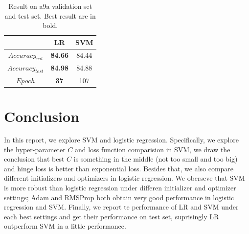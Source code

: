 \documentclass[journal, a4paper]{IEEEtran}
\begin{document}
\begin{table}[!hbt]
	\begin{center}
		\caption{Result on a9a validation set and test set. Best result are in bold.}
		\label{tab:final_performance}
		\begin{tabular}{|c|c|c|}
			\hline
			& LR & SVM \\
			\hline
			$Accuracy_{val}$   & \textbf{84.66} & 84.44   \\
			\hline
			$Accuracy_{test}$   & \textbf{84.98} & 84.88   \\
			\hline
			$Epoch$  & \textbf{37} & 107   \\
			\hline
		\end{tabular}
	\end{center}
\end{table} \par

\section{Conclusion}
In this report, we explore SVM and logistic regression. Specifically, we explore the hyper-parameter $C$ and loss function comparision in SVM, we draw the conclusion that best $C$ is something in the middle (not too small and too big) and hinge loss is better than exponential loss. Besides that, we also compare different initializers and optimizers in logistic regression. We oberseve that SVM is more robust than logistic regression under differen initializer and optimizer settings; Adam and RMSProp both obtain very good performance in logistic regression and SVM. Finally, we report te performance of LR and SVM under each best settings and get their performance on test set, suprisingly LR outperform SVM in a little performance.\par


\end{document}
